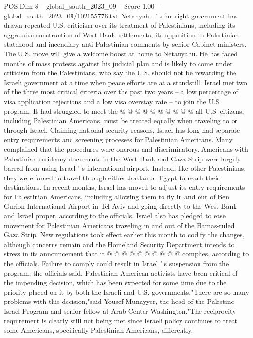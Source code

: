 \begin{textsample}{POS Dim 8 – global\_south\_2023\_09 – Score 1.00 – global\_south\_2023\_09/102055776.txt}
Netanyahu ' s far-right government has drawn repeated U.S. criticism over its treatment of Palestinians, including its aggressive construction of West Bank settlements, its opposition to Palestinian statehood and incendiary anti-Palestinian comments by senior Cabinet ministers.
The U.S. move will give a welcome boost at home to Netanyahu.
He has faced months of mass protests against his judicial plan and is likely to come under criticism from the Palestinians, who say the U.S. should not be rewarding the Israeli government at a time when peace efforts are at a standstill.
Israel met two of the three most critical criteria over the past two years -- a low percentage of visa application rejections and a low visa overstay rate -- to join the U.S. program.
It had struggled to meet the @ @ @ @ @ @ @ @ @ @ all U.S. citizens, including Palestinian Americans, must be treated equally when traveling to or through Israel.
Claiming national security reasons, Israel has long had separate entry requirements and screening processes for Palestinian Americans.
Many complained that the procedures were onerous and discriminatory.
Americans with Palestinian residency documents in the West Bank and Gaza Strip were largely barred from using Israel ' s international airport.
Instead, like other Palestinians, they were forced to travel through either Jordan or Egypt to reach their destinations.
In recent months, Israel has moved to adjust its entry requirements for Palestinian Americans, including allowing them to fly in and out of Ben Gurion International Airport in Tel Aviv and going directly to the West Bank and Israel proper, according to the officials.
Israel also has pledged to ease movement for Palestinian Americans traveling in and out of the Hamas-ruled Gaza Strip.
New regulations took effect earlier this month to codify the changes, although concerns remain and the Homeland Security Department intends to stress in its announcement that it @ @ @ @ @ @ @ @ @ @ complies, according to the officials.
Failure to comply could result in Israel ' s suspension from the program, the officials said.
Palestinian American activists have been critical of the impending decision, which has been expected for some time due to the priority placed on it by both the Israeli and U.S. governments."There are so many problems with this decision,"said Yousef Munayyer, the head of the Palestine-Israel Program and senior fellow at Arab Center Washington."The reciprocity requirement is clearly still not being met since Israeli policy continues to treat some Americans, specifically Palestinian Americans, differently.

\end{textsample}
